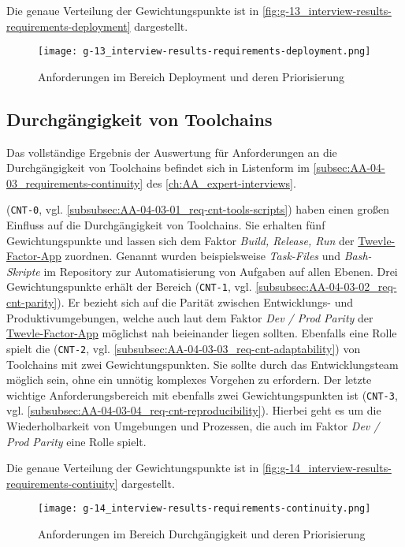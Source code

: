 Die genaue Verteilung der Gewichtungspunkte ist in \autoref{fig:g-13_interview-results-requirements-deployment} dargestellt.

\begin{figure}[h]
    \centering
    \texttt{[image: g-13\_interview-results-requirements-deployment.png]}
    \caption{Anforderungen im Bereich Deployment und deren Priorisierung}
    \label{fig:g-13_interview-results-requirements-deployment}
\end{figure}

\subsection{Durchgängigkeit von Toolchains}
\label{subsec:04-02-04_consistency-of-toolchains}

Das vollständige Ergebnis der Auswertung für Anforderungen an die Durchgängigkeit von Toolchains befindet sich in Listenform im \autoref{subsec:AA-04-03_requirements-continuity} des \autoref{ch:AA_expert-interviews}.

\textbf{} (\texttt{CNT-0}, vgl. \autoref{subsubsec:AA-04-03-01_req-cnt-tools-scripts}) haben einen großen Einfluss auf die Durchgängigkeit von Toolchains. Sie erhalten fünf Gewichtungspunkte und lassen sich dem Faktor \textit{Build, Release, Run} der \hyperref[sec:03-05_basic-idea-of-twelve-factor-app]{Twevle-Factor-App} zuordnen. Genannt wurden beispielsweise \textit{Task-Files} und \textit{Bash-Skripte} im Repository zur Automatisierung von Aufgaben auf allen Ebenen. Drei Gewichtungspunkte erhält der Bereich \textbf{} (\texttt{CNT-1}, vgl. \autoref{subsubsec:AA-04-03-02_req-cnt-parity}). Er bezieht sich auf die Parität zwischen Entwicklungs- und Produktivumgebungen, welche auch laut dem Faktor \textit{Dev / Prod Parity} der \hyperref[sec:03-05_basic-idea-of-twelve-factor-app]{Twevle-Factor-App} möglichst nah beieinander liegen sollten. Ebenfalls eine Rolle spielt die \textbf{} (\texttt{CNT-2}, vgl. \autoref{subsubsec:AA-04-03-03_req-cnt-adaptability}) von Toolchains mit zwei Gewichtungspunkten. Sie sollte durch das Entwicklungsteam möglich sein, ohne ein unnötig komplexes Vorgehen zu erfordern. Der letzte wichtige Anforderungsbereich mit ebenfalls zwei Gewichtungspunkten ist \textbf{} (\texttt{CNT-3}, vgl. \autoref{subsubsec:AA-04-03-04_req-cnt-reproducibility}). Hierbei geht es um die Wiederholbarkeit von Umgebungen und Prozessen, die auch im Faktor \textit{Dev / Prod Parity} eine Rolle spielt.

Die genaue Verteilung der Gewichtungspunkte ist in \autoref{fig:g-14_interview-results-requirements-contiuity} dargestellt.

\begin{figure}[h]
    \centering
    \texttt{[image: g-14\_interview-results-requirements-continuity.png]}
    \caption{Anforderungen im Bereich Durchgängigkeit und deren Priorisierung}
    \label{fig:g-14_interview-results-requirements-contiuity}
\end{figure}
